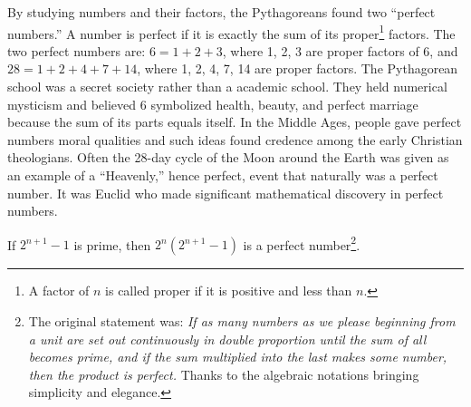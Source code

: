 \documentclass[b5paper]{article}
\begin{document}
By studying numbers and their factors, the Pythagoreans found two \enquote{perfect numbers.} A number is perfect if it is exactly the sum of its proper\footnote{A factor of $n$ is called proper if it is positive and less than $n$.} factors. The two perfect numbers are: $6 = 1 + 2 + 3$, where 1, 2, 3 are proper factors of 6, and $28 = 1 + 2 + 4 + 7 + 14$, where 1, 2, 4, 7, 14 are proper factors. The Pythagorean school was a secret society rather than a academic school. They held numerical mysticism and believed 6 symbolized health, beauty, and perfect marriage because the sum of its parts equals itself. In the Middle Ages, people gave perfect numbers moral qualities and such ideas found credence among the early Christian theologians. Often the 28-day cycle of the Moon around the Earth was given as an example of a \enquote{Heavenly,} hence perfect, event that naturally was a perfect number. It was Euclid who made significant mathematical discovery in perfect numbers.

\begin{theorem}
If $2^{n+1}-1$ is prime, then $2^n(2^{n+1}-1)$ is a perfect number\footnote{The original statement was: \emph{If as many numbers as we please beginning from a unit are set out continuously in double proportion until the sum of all becomes prime, and if the sum multiplied into the last makes some number, then the product is perfect.} Thanks to the algebraic notations bringing simplicity and elegance.}.
\end{theorem}
\end{document}
